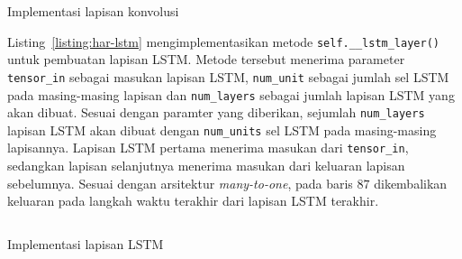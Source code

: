 \begin{listing}[h]
    \inputminted[firstline=51,firstnumber=51,lastline=74,gobble=4]{python}{../har/har.py}
    \caption{Implementasi lapisan konvolusi}
    \label{listing:har-konvolusi}
\end{listing}

Listing~\ref{listing:har-lstm} mengimplementasikan metode \texttt{self.__lstm_layer()} untuk pembuatan lapisan LSTM\@. Metode tersebut menerima parameter \texttt{tensor_in} sebagai masukan lapisan LSTM, \texttt{num_unit} sebagai jumlah sel LSTM pada masing-masing lapisan dan \texttt{num_layers} sebagai jumlah lapisan LSTM yang akan dibuat. Sesuai dengan paramter yang diberikan, sejumlah \texttt{num_layers} lapisan LSTM akan dibuat dengan \texttt{num_units} sel LSTM pada masing-masing lapisannya. Lapisan LSTM pertama menerima masukan dari \texttt{tensor_in}, sedangkan lapisan selanjutnya menerima masukan dari keluaran lapisan sebelumnya. Sesuai dengan arsitektur \textit{many-to-one}, pada baris $87$ dikembalikan keluaran pada langkah waktu terakhir dari lapisan LSTM terakhir.

\begin{listing}[h]
    \inputminted[firstline=76,firstnumber=76,lastline=87,gobble=4]{python}{../har/har.py}
    \caption{Implementasi lapisan LSTM}
    \label{listing:har-lstm}
\end{listing}






